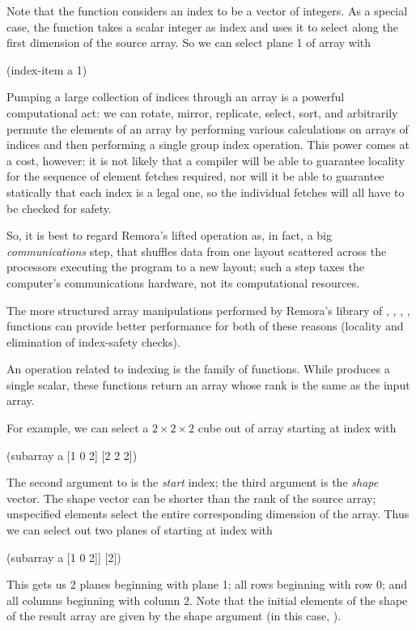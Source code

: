 Note that the  function considers an index to be a vector
of integers.
As a special case, the function  takes a scalar integer
as index and uses it to select along the first dimension of the source
array.
So we can select plane 1 of array  with
\begin{code}
    (index-item a 1)
\result{[[0 2 4 6]
 [1 3 5 7]]}\end{code}


Pumping a large collection of indices through an array is a 
powerful computational act: we can rotate, mirror, replicate,
select, sort, and arbitrarily permute the elements of an array
by performing various calculations on arrays of indices and then
performing a single group index operation.
This power comes at a cost, however:
it is not likely that a compiler will be able to guarantee locality for
the sequence of element fetches required, nor will it be able
to guarantee statically that each index is a legal one, so the
individual fetches will all have to be checked for safety.

So, it is best to regard Remora's lifted  operation as,
in fact, a big \emph{communications} step, that shuffles data
from one layout scattered across the processors executing the
program to a new layout;
such a step taxes the computer's communications hardware, 
not its computational resources.

The more structured array manipulations performed by Remora's
library of , , , , {\etc}
functions can provide better performance for both of these reasons
(locality and elimination of index-safety checks).

An operation related to indexing is the family of  functions.
While  produces a single scalar, 
these functions return an array whose rank is the same as the input array.

For example, we can select a $2 \times 2 \times 2$ cube out of array 
starting at index \ex{[1 0 2]} with
\begin{code}
    (subarray a [1 0 2] [2 2 2])
\result{[[[4 6]
  [5 7]]

 [[32 33]
  [42 43]]]}\end{code}

The second argument to  is the \emph{start} index;
the third argument is the \emph{shape} vector.
The shape vector can be shorter than the rank of the source array;
unspecified elements select the entire corresponding dimension of the
array.
Thus we can select out two planes of  starting at index \ex{[1 0 2]}
with
\begin{code}
    (subarray a [1 0 2]] [2])
\result{[[[ 4  6]
  [ 5  7]]

 [[32 33]
  [42 43]]]}\end{code}
This gets us 2 planes beginning with plane 1;
all rows beginning with row 0; and
all columns beginning with column 2.
Note that the initial elements of the shape of the result array
are given by the shape argument (in this case, \ex{[2]}).

